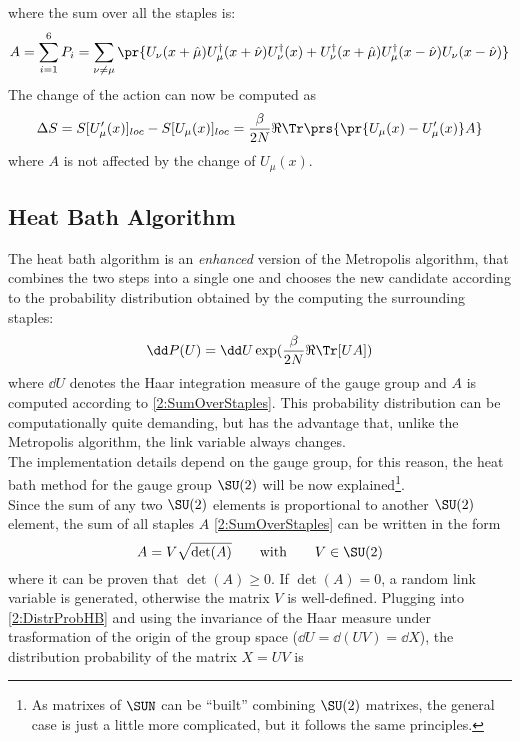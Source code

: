 where the sum over all the staples is:
\begin{equation}
    A = \sum_{i=1}^6P_i = \sum_{\nu\neq\mu}\pr{U_\nu(x+\hat\mu)U^\dagger_\mu(x+\hat\nu)U^\dagger_\nu(x) + U^\dagger_\nu(x+\hat\mu)U^\dagger_\mu(x-\hat\nu)U_\nu(x-\hat\nu)} \label{2:SumOverStaples}
\end{equation}
The change of the action can now be computed as
\begin{equation}
    \Delta S = S[U'_\mu(x)]_{loc}-S[U_\mu(x)]_{loc} = \frac\beta{2N} \Re\Tr\prs{\pr{U_\mu(x)-U'_\mu(x)}A} \label{2:MetropolisActionVar}
\end{equation}
where $A$ is not affected by the change of $U_\mu(x)$.

\subsection{Heat Bath Algorithm}
The heat bath algorithm is an \emph{enhanced} version of the Metropolis algorithm, that combines the two steps into a single one and chooses the new candidate according to the probability distribution obtained by the computing the surrounding staples:
\begin{equation}
    \dd P(U) = \dd U \exp(\frac\beta{2N}\Re\Tr[U A]) \label{2:DistrProbHB}
\end{equation}
where $\dd U$ denotes the Haar integration measure of the gauge group and $A$ is computed according to \eqref{2:SumOverStaples}.
This probability distribution can be computationally quite demanding, but has the advantage that, unlike the Metropolis algorithm, the link variable always changes.\\
The implementation details depend on the gauge group, for this reason, the heat bath method for the gauge group $\SU(2)$ will be now explained\footnote{As matrixes of $\SUN$ can be ``built'' combining $\SU(2)$ matrixes, the general case is just a little more complicated, but it follows the same principles.}.\\
Since the sum of any two $\SU(2)$ elements is proportional to another $\SU(2)$ element, the sum of all staples $A$ \eqref{2:SumOverStaples} can be written in the form
\begin{equation}
    A = V\sqrt{\det(A)} \qquad\text{with}\qquad V\in\SU(2) \label{2:SumOverStaplesSU2}
\end{equation}
where it can be proven that $\det(A)\geq0$.
If $\det(A)=0$, a random link variable is generated, otherwise the matrix $V$ is well-defined.
Plugging into \eqref{2:DistrProbHB} and using the invariance of the Haar measure under trasformation of the origin of the group space ($\dd U = \dd (UV) = \dd X$), the distribution probability of the matrix $X=UV$ is
